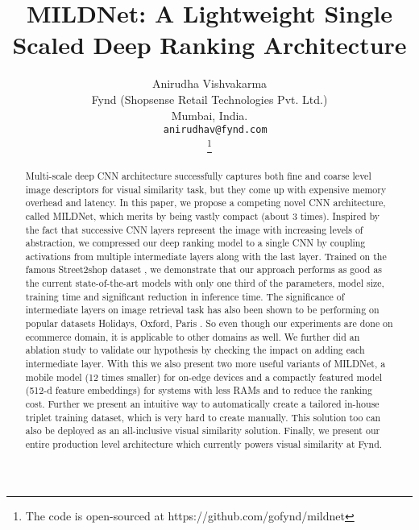 \documentclass[10pt,twocolumn,letterpaper]{article}
\newcommand\blfootnote[1]{\begingroup
  \renewcommand\thefootnote{}\footnote{#1}\addtocounter{footnote}{-1}\endgroup
}
\begin{document}
\title{\LARGE \bf
MILDNet: A Lightweight Single Scaled Deep Ranking Architecture}

\author{Anirudha Vishvakarma\\
	Fynd (Shopsense Retail Technologies Pvt. Ltd.)\\ Mumbai, India.\\
	{\tt\small ~~anirudhav@fynd.com}\\  \vspace{-1mm}
	\blfootnote{The code is open-sourced at https://github.com/gofynd/mildnet}
}

\maketitle




\begin{abstract}\vspace{-3mm}
Multi-scale deep CNN architecture \cite{c1, c2, c3} successfully captures both fine and coarse level image descriptors for visual similarity task, but they come up with expensive memory overhead and latency. In this paper, we propose a competing novel CNN architecture, called MILDNet, which merits by being vastly compact (about 3 times). Inspired by the fact that successive CNN layers represent the image with increasing levels of abstraction, we compressed our deep ranking model to a single CNN by coupling activations from multiple intermediate layers along with the last layer. Trained on the famous Street2shop dataset \cite{c4}, we demonstrate that our approach performs as good as the current state-of-the-art models with only one third of the parameters, model size, training time and significant reduction in inference time. The significance of intermediate layers on image retrieval task has also been shown to be performing on popular datasets Holidays, Oxford, Paris \cite{c5}. So even though our experiments are done on ecommerce domain, it is applicable to other domains as well. We further did an ablation study to validate our hypothesis by checking the impact on adding each intermediate layer. With this we also present two more useful variants of MILDNet, a mobile model (12 times smaller) for on-edge devices and a compactly featured model (512-d feature embeddings) for systems with less RAMs and to reduce the ranking cost.
Further we present an intuitive way to automatically create a tailored in-house triplet training dataset, which is very hard to create manually. This solution too can also be deployed as an all-inclusive visual similarity solution. Finally, we present our entire production level architecture which currently powers visual similarity at Fynd.
\end{abstract}
\end{document}
